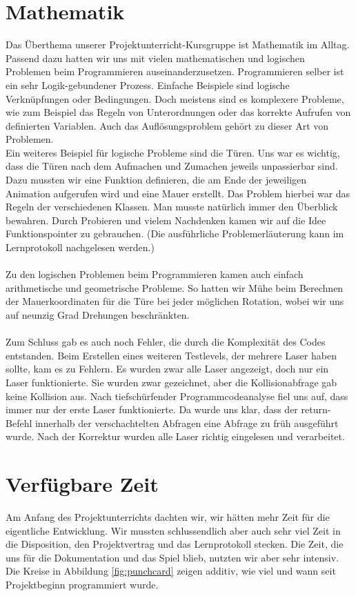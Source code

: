 \documentclass[11pt,a4paper]{scrbook}
\begin{document}
\section{Mathematik}
Das Überthema unserer Projektunterricht-Kursgruppe ist Mathematik im Alltag.
Passend dazu hatten wir uns mit vielen mathematischen und logischen Problemen beim Programmieren auseinanderzusetzen.
Programmieren selber ist ein sehr Logik-gebundener Prozess.
Einfache Beispiele sind logische Verknüpfungen oder Bedingungen.
Doch meistens sind es komplexere Probleme, wie zum Beispiel das Regeln von Unterordnungen oder das korrekte Aufrufen von definierten Variablen.
Auch das Auflösungsproblem gehört zu dieser Art von Problemen.
\\
Ein weiteres Beispiel für logische Probleme sind die Türen.
Uns war es wichtig, dass die Türen nach dem Aufmachen und Zumachen jeweils unpassierbar sind.
Dazu mussten wir eine Funktion definieren, die am Ende der jeweiligen Animation aufgerufen wird und eine Mauer erstellt.
Das Problem hierbei war das Regeln der verschiedenen Klassen. Man musste natürlich immer den Überblick bewahren.
Durch Probieren und vielem Nachdenken kamen wir auf die Idee Funktionspointer zu gebrauchen.
(Die ausführliche Problemerläuterung kann im Lernprotokoll nachgelesen werden.)\\
\\
Zu den logischen Problemen beim Programmieren kamen auch einfach arithmetische und geometrische Probleme.
So hatten wir Mühe beim Berechnen der Mauerkoordinaten für die Türe bei jeder möglichen Rotation, wobei wir uns auf neunzig Grad Drehungen beschränkten.\\
\\
Zum Schluss gab es auch noch Fehler, die durch die Komplexität des Codes entstanden.
Beim Erstellen eines weiteren Testlevels, der mehrere Laser haben sollte, kam es zu Fehlern.
Es wurden zwar alle Laser angezeigt, doch nur ein Laser funktionierte.
Sie wurden zwar gezeichnet, aber die Kollisionabfrage gab keine Kollision aus.
Nach tiefschürfender Programmcodeanalyse fiel uns auf, dass immer nur der erste Laser funktionierte. Da wurde uns klar, dass der return-Befehl innerhalb der verschachtelten Abfragen eine Abfrage zu früh ausgeführt wurde. Nach der Korrektur wurden alle Laser richtig eingelesen und verarbeitet.



\section{Verfügbare Zeit}
Am Anfang des Projektunterrichts dachten wir, wir hätten mehr Zeit für die eigentliche Entwicklung. Wir mussten schlussendlich aber auch
sehr viel Zeit in die Disposition, den Projektvertrag und das Lernprotokoll stecken. Die Zeit, die uns für die Dokumentation und das Spiel
blieb, nutzten wir aber sehr intensiv. Die Kreise in Abbildung \ref{fig:punchcard} zeigen additiv, wie viel und wann seit Projektbeginn programmiert wurde.
\end{document}
